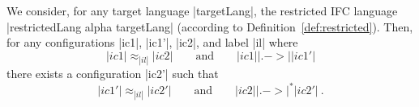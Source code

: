 \begin{lemma}
  \label{lemma:rr-tsni-general}
  We consider, for any target language |targetLang|,
  the restricted IFC language |restrictedLang alpha targetLang|
  (according to Definition~\ref{def:restricted}).
  Then,
  for any configurations |ic1|, |ic1'|, |ic2|, and label |il| where
  \begin{equation} \label{eq:tsni-lemma-lhs}
  |ic1| \approx_{|il|} |ic2|
  \qquad \text{and} \qquad
  |ic1| |.->| |ic1'|
  \end{equation}
  there exists a configuration |ic2'| such that
  \begin{equation} \label{eq:tsni-lemma-rhs}
  |ic1'| \approx_{|il|} |ic2'|
  \qquad \text{and} \qquad
  |ic2| |.->|^* |ic2'|
  \ \text{.}
  \end{equation}
\end{lemma}
